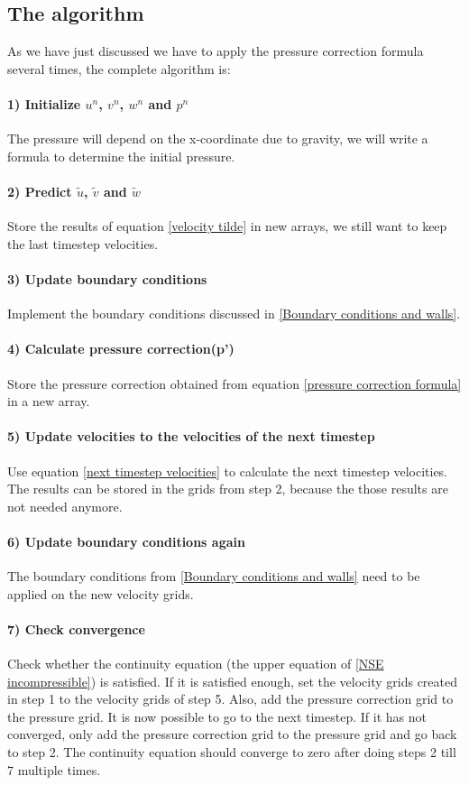 \documentclass{article}
\begin{document}
\subsection{The algorithm}
As we have just discussed we have to apply the pressure correction formula several times, the complete algorithm is: \cite{MAC}
\paragraph{1) Initialize \(u^n\), \(v^n\), \(w^n\) and \(p^n\)} The pressure will depend on the x-coordinate due to gravity, we will write a formula to determine the initial pressure.
\paragraph{2) Predict \(\tilde{u}\), \(\tilde{v}\) and \(\tilde{w}\)} Store the results of equation \ref{velocity tilde} in new arrays, we still want to keep the last timestep velocities. 
\paragraph{3) Update boundary conditions} Implement the boundary conditions discussed in \ref{Boundary conditions and walls}.
\paragraph{4) Calculate pressure correction(p')} Store the pressure correction obtained from equation \ref{pressure correction formula} in a new array.
\paragraph{5) Update velocities to the velocities of the next timestep} Use equation \ref{next timestep velocities} to calculate the next timestep velocities. The results can be stored in the grids from step 2, because the those results are not needed anymore.
\paragraph{6) Update boundary conditions again} The boundary conditions from \ref{Boundary conditions and walls} need to be applied on the new velocity grids.
\paragraph{7) Check convergence} Check whether the continuity equation (the upper equation of \ref{NSE incompressible}) is satisfied. If it is satisfied enough, set the velocity grids created in step 1 to the velocity grids of step 5. Also, add the pressure correction grid to the pressure grid. It is now possible to go to the next timestep. If it has not converged, only add the pressure correction grid to the pressure grid and go back to step 2. The continuity equation should converge to zero after doing steps 2 till 7 multiple times. 
\end{document}
